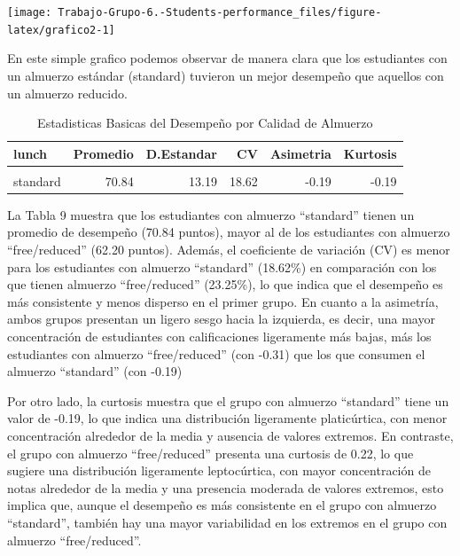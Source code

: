 \documentclass[
]{article}
\begin{document}
\begin{center}\texttt{[image: Trabajo-Grupo-6.-Students-performance\_files/figure-latex/grafico2-1]} \end{center}

En este simple grafico podemos observar de manera clara que los
estudiantes con un almuerzo estándar (standard) tuvieron un mejor
desempeño que aquellos con un almuerzo reducido.

\begin{table}[!h]
\centering
\caption{\label{tab:calculos basicos2}Estadisticas Basicas del Desempeño por Calidad de Almuerzo}
\centering
\begin{tabular}[t]{lrrrrr}
\toprule
lunch & Promedio & D.Estandar & CV & Asimetria & Kurtosis\\
\midrule
\cellcolor{gray!10}{free/reduced} & \cellcolor{gray!10}{62.20} & \cellcolor{gray!10}{14.46} & \cellcolor{gray!10}{23.25} & \cellcolor{gray!10}{-0.31} & \cellcolor{gray!10}{0.22}\\
standard & 70.84 & 13.19 & 18.62 & -0.19 & -0.19\\
\bottomrule
\end{tabular}
\end{table}

La Tabla 9 muestra que los estudiantes con almuerzo ``standard'' tienen
un promedio de desempeño (70.84 puntos), mayor al de los estudiantes con
almuerzo ``free/reduced'' (62.20 puntos). Además, el coeficiente de
variación (CV) es menor para los estudiantes con almuerzo ``standard''
(18.62\%) en comparación con los que tienen almuerzo ``free/reduced''
(23.25\%), lo que indica que el desempeño es más consistente y menos
disperso en el primer grupo. En cuanto a la asimetría, ambos grupos
presentan un ligero sesgo hacia la izquierda, es decir, una mayor
concentración de estudiantes con calificaciones ligeramente más bajas,
más los estudiantes con almuerzo ``free/reduced'' (con -0.31) que los
que consumen el almuerzo ``standard'' (con -0.19)

Por otro lado, la curtosis muestra que el grupo con almuerzo
``standard'' tiene un valor de -0.19, lo que indica una distribución
ligeramente platicúrtica, con menor concentración alrededor de la media
y ausencia de valores extremos. En contraste, el grupo con almuerzo
``free/reduced'' presenta una curtosis de 0.22, lo que sugiere una
distribución ligeramente leptocúrtica, con mayor concentración de notas
alrededor de la media y una presencia moderada de valores extremos, esto
implica que, aunque el desempeño es más consistente en el grupo con
almuerzo ``standard'', también hay una mayor variabilidad en los
extremos en el grupo con almuerzo ``free/reduced''.
\end{document}
